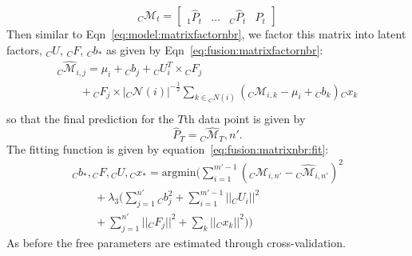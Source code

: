 \begin{equation}
  \label{eq:fusion:predictionmatrix}
  {}_C\mathcal{M}_{t} = \left[\begin{array}{llll}
      {}_1\widehat{P}_{t}& \dots & {}_C\widehat{P}_t & P_t 
    \end{array}
  \right]
\end{equation}
Then similar to Eqn~\ref{eq:model:matrixfactornbr}, we 
factor this matrix into latent factors, ${}_C U$, ${}_C F$, ${}_C b_*$ as 
given by Eqn~\ref{eq:fusion:matrixfactornbr}:
\begin{equation}
  \label{eq:fusion:matrixfactornbr}
  \begin{array}{l}
    {}_C \widehat{\mathcal{M}}_{i,j} =  \mu_i + {}_C b_{j} + {}_C U_i^T\times {}_C F_j \\
                                \qquad + {}_C F_j \times |{}_C \mathcal{N}(i)|^{-\frac{1}{2}}
    \sum_{k \in {}_C N(i)} ({}_C\mathcal{M}_{i,k} - \mu_i + {}_C b_{k}) {}_Cx_k \\
  \end{array}
\end{equation}
so that the final prediction for the
$T$th data point is given by
\[\widehat{P}_T = {}_C \widehat{\mathcal{M}}_T,n'.\]
The fitting function is given by equation~\ref{eq:fusion:matrixnbr:fit}:
\begin{equation}
  \label{eq:fusion:matrixnbr:fit}
  \begin{array}{l}
    {}_C b_*, {}_C F, {}_C U, {}_C x_*  = \textrm{argmin} (\sum \limits_{i=1}^{m'-1} \left({}_C \mathcal{M}_{i,n'} - {}_C \widehat{\mathcal{M}}_{i,n'}   \right)^2 \\
     \qquad + \lambda_3 (\sum \limits_{j=1}^{n'}{}_C b_j^2 + \sum \limits_{i=1}^{m'-1} ||{}_C U_i||^2 \\
     \qquad+ \sum \limits_{j=1}^{n'} ||{}_C F_j||^2 + \sum_k ||{}_C x_k||^2))
  \end{array}
\end{equation}
\noindent
As before the free parameters are estimated through cross-validation.

